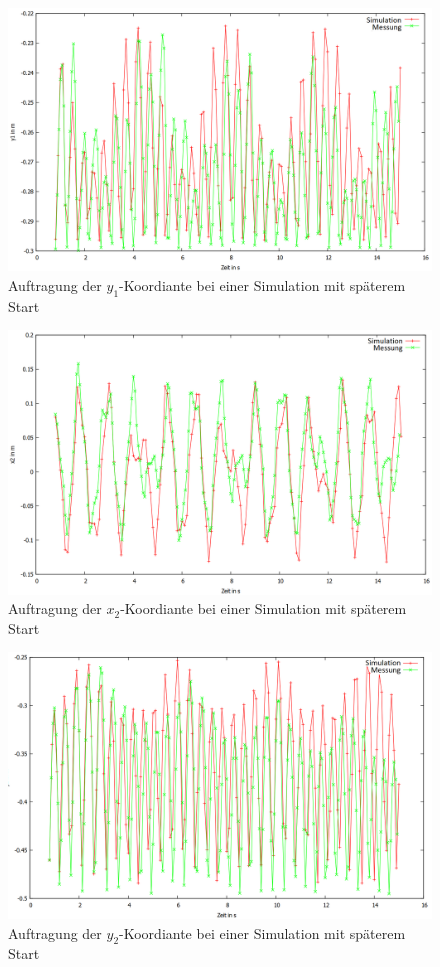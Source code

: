 \begin{figure}
        \includegraphics[width=.9\textwidth]{images/y1_ueber_t_neu.png}
\caption{Auftragung der $y_1$-Koordiante bei einer Simulation mit späterem Start}
\label{y1_ueber_t}
\end{figure}

\begin{figure}
        \includegraphics[width=.9\textwidth]{images/x2_ueber_t_neu.png}
\caption{Auftragung der $x_2$-Koordiante bei einer Simulation mit späterem Start}
\label{x2_ueber_t}
\end{figure}

\begin{figure}
        \includegraphics[width=.9\textwidth]{images/y2_ueber_t_neu.png}
\caption{Auftragung der $y_2$-Koordiante bei einer Simulation mit späterem Start}
\label{y2_ueber_t}
\end{figure}

